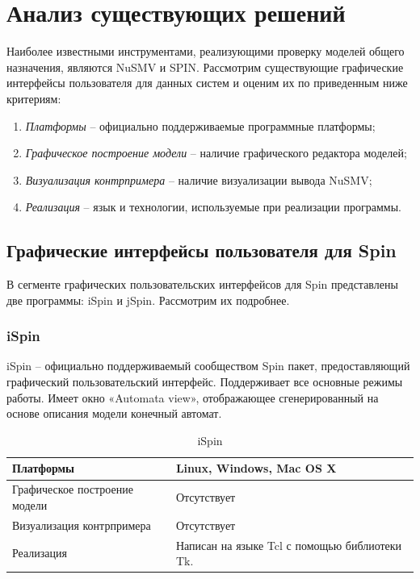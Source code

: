 \chapter{Анализ существующих решений}

Наиболее известными инструментами, реализующими проверку моделей общего назначения, являются NuSMV и SPIN. Рассмотрим существующие графические интерфейсы пользователя для данных систем и оценим их по приведенным ниже критериям:

\begin{enumerate}
	\item \textit{Платформы} -- официально поддерживаемые программные платформы;
	\item \textit{Графическое построение модели} -- наличие графического редактора моделей;
	\item \textit{Визуализация контрпримера} -- наличие визуализации вывода NuSMV;
	\item \textit{Реализация} -- язык и технологии, используемые при реализации программы.
\end{enumerate}

\section{Графические интерфейсы пользователя для Spin}
	
В сегменте графических пользовательских интерфейсов для Spin представлены две программы: iSpin и jSpin. Рассмотрим их подробнее.

\subsection{iSpin}

iSpin – официально поддерживаемый сообществом Spin пакет, предоставляющий графический пользовательский интерфейс. Поддерживает все основные режимы работы. Имеет окно «Automata view», отображающее сгенерированный на основе описания модели конечный автомат. 


\begin{table}[ht]
	\caption{iSpin}\label{tab:ispin}
	\centering
	\begin{tabular}{|m{2.5 cm}|m{7.5 cm}|}
	\hline
	Платформы & Linux, Windows, Mac OS X \\
	\hline
	Графическое построение модели &Отсутствует \\
	\hline
	Визуализация контрпримера & Отсутствует \\
	\hline
	Реализация & Написан на языке Tcl с помощью библиотеки Tk.\\
	\hline
	\end{tabular}
\end{table}

